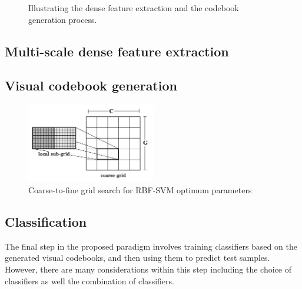 \documentclass[12pt]{article}
\begin{document}
\begin{figure}
\centering
{}
\caption{Illustrating the dense feature extraction and the codebook generation process.}
\end{figure}


\subsection{Multi-scale dense feature extraction}


\subsection{Visual codebook generation}


\begin{figure}[H]
\centering
\includegraphics[width = 0.5\textwidth, height =0.2\textheight]{gridsearch}
\caption{Coarse-to-fine grid search for RBF-SVM optimum parameters}
\label{fig:gridsearch}
\end{figure}

\subsection{Classification}
The final step in the proposed paradigm involves training classifiers based on the generated visual codebooks, and then using them to predict test samples. However, there are many considerations within this step including the choice of classifiers as well the combination of classifiers.
\end{document}
